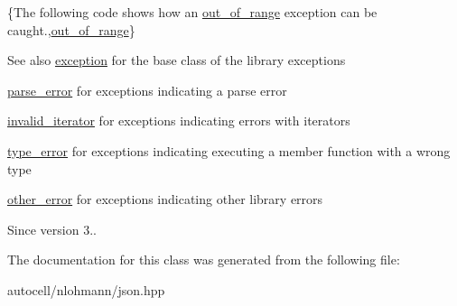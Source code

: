 \{The following code shows how an {\ttfamily \mbox{\hyperlink{classnlohmann_1_1detail_1_1out__of__range}{out\+\_\+of\+\_\+range}}} exception can be caught.,\mbox{\hyperlink{classnlohmann_1_1detail_1_1out__of__range}{out\+\_\+of\+\_\+range}}\}

\begin{DoxySeeAlso}{See also}
\mbox{\hyperlink{classnlohmann_1_1detail_1_1exception}{exception}} for the base class of the library exceptions 

\mbox{\hyperlink{classnlohmann_1_1detail_1_1parse__error}{parse\+\_\+error}} for exceptions indicating a parse error 

\mbox{\hyperlink{classnlohmann_1_1detail_1_1invalid__iterator}{invalid\+\_\+iterator}} for exceptions indicating errors with iterators 

\mbox{\hyperlink{classnlohmann_1_1detail_1_1type__error}{type\+\_\+error}} for exceptions indicating executing a member function with a wrong type 

\mbox{\hyperlink{classnlohmann_1_1detail_1_1other__error}{other\+\_\+error}} for exceptions indicating other library errors
\end{DoxySeeAlso}
\begin{DoxySince}{Since}
version 3.. 
\end{DoxySince}


The documentation for this class was generated from the following file\+:\begin{DoxyCompactItemize}
\item 
autocell/nlohmann/json.\+hpp\end{DoxyCompactItemize}

